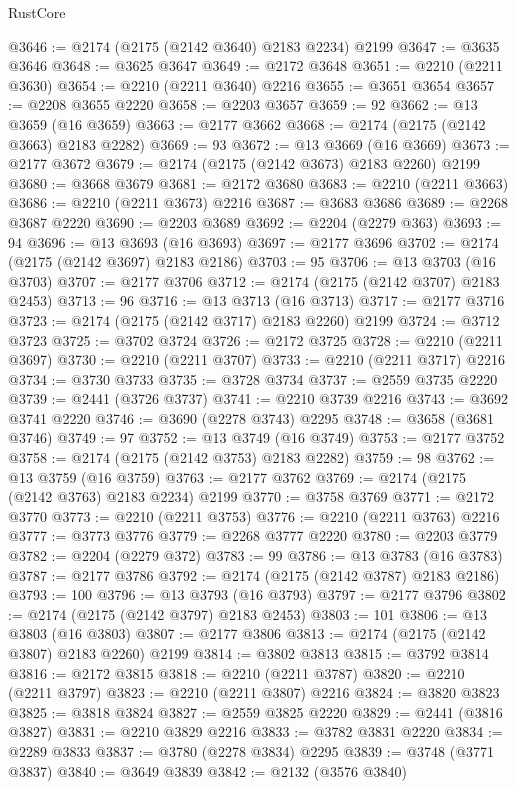 \begin{lexlean}{RustCore}
\begin{coremodule}
@3646 := @2174 (@2175 (@2142 @3640) @2183 @2234) @2199
@3647 := @3635 @3646
@3648 := @3625 @3647
@3649 := @2172 @3648
@3651 := @2210 (@2211 @3630)
@3654 := @2210 (@2211 @3640) @2216
@3655 := @3651 @3654
@3657 := @2208 @3655 @2220
@3658 := @2203 @3657
@3659 := 92
@3662 := @13 @3659 (@16 @3659)
@3663 := @2177 @3662
@3668 := @2174 (@2175 (@2142 @3663) @2183 @2282)
@3669 := 93
@3672 := @13 @3669 (@16 @3669)
@3673 := @2177 @3672
@3679 := @2174 (@2175 (@2142 @3673) @2183 @2260) @2199
@3680 := @3668 @3679
@3681 := @2172 @3680
@3683 := @2210 (@2211 @3663)
@3686 := @2210 (@2211 @3673) @2216
@3687 := @3683 @3686
@3689 := @2268 @3687 @2220
@3690 := @2203 @3689
@3692 := @2204 (@2279 @363)
@3693 := 94
@3696 := @13 @3693 (@16 @3693)
@3697 := @2177 @3696
@3702 := @2174 (@2175 (@2142 @3697) @2183 @2186)
@3703 := 95
@3706 := @13 @3703 (@16 @3703)
@3707 := @2177 @3706
@3712 := @2174 (@2175 (@2142 @3707) @2183 @2453)
@3713 := 96
@3716 := @13 @3713 (@16 @3713)
@3717 := @2177 @3716
@3723 := @2174 (@2175 (@2142 @3717) @2183 @2260) @2199
@3724 := @3712 @3723
@3725 := @3702 @3724
@3726 := @2172 @3725
@3728 := @2210 (@2211 @3697)
@3730 := @2210 (@2211 @3707)
@3733 := @2210 (@2211 @3717) @2216
@3734 := @3730 @3733
@3735 := @3728 @3734
@3737 := @2559 @3735 @2220
@3739 := @2441 (@3726 @3737)
@3741 := @2210 @3739 @2216
@3743 := @3692 @3741 @2220
@3746 := @3690 (@2278 @3743) @2295
@3748 := @3658 (@3681 @3746)
@3749 := 97
@3752 := @13 @3749 (@16 @3749)
@3753 := @2177 @3752
@3758 := @2174 (@2175 (@2142 @3753) @2183 @2282)
@3759 := 98
@3762 := @13 @3759 (@16 @3759)
@3763 := @2177 @3762
@3769 := @2174 (@2175 (@2142 @3763) @2183 @2234) @2199
@3770 := @3758 @3769
@3771 := @2172 @3770
@3773 := @2210 (@2211 @3753)
@3776 := @2210 (@2211 @3763) @2216
@3777 := @3773 @3776
@3779 := @2268 @3777 @2220
@3780 := @2203 @3779
@3782 := @2204 (@2279 @372)
@3783 := 99
@3786 := @13 @3783 (@16 @3783)
@3787 := @2177 @3786
@3792 := @2174 (@2175 (@2142 @3787) @2183 @2186)
@3793 := 100
@3796 := @13 @3793 (@16 @3793)
@3797 := @2177 @3796
@3802 := @2174 (@2175 (@2142 @3797) @2183 @2453)
@3803 := 101
@3806 := @13 @3803 (@16 @3803)
@3807 := @2177 @3806
@3813 := @2174 (@2175 (@2142 @3807) @2183 @2260) @2199
@3814 := @3802 @3813
@3815 := @3792 @3814
@3816 := @2172 @3815
@3818 := @2210 (@2211 @3787)
@3820 := @2210 (@2211 @3797)
@3823 := @2210 (@2211 @3807) @2216
@3824 := @3820 @3823
@3825 := @3818 @3824
@3827 := @2559 @3825 @2220
@3829 := @2441 (@3816 @3827)
@3831 := @2210 @3829 @2216
@3833 := @3782 @3831 @2220
@3834 := @2289 @3833
@3837 := @3780 (@2278 @3834) @2295
@3839 := @3748 (@3771 @3837)
@3840 := @3649 @3839
@3842 := @2132 (@3576 @3840)

\end{coremodule}
\end{lexlean}
